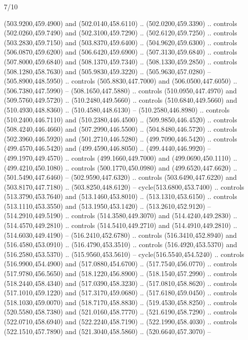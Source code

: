 \begin{flagdescription}{7/10}
\begin{scope}[xshift=0.5\flaglength]
\begin{scope}[scale=0.00185\flagwidth,yshift=245mm,xshift=-43.7mm]
\begin{scope}[y=-0.8pt, x=0.8pt, inner sep=0pt, outer sep=0pt]
\begin{scope}[shift={(-344.0678,183.89831)},fill=brown]
  (503.9200,459.4900) and (502.0140,458.6110) .. (502.0200,459.3390) .. controls
  (502.0260,459.7490) and (502.3100,459.7290) .. (502.6120,459.7250) .. controls
  (503.2830,459.7150) and (503.8370,459.6400) .. (504.9620,459.6300) .. controls
  (506.0870,459.6200) and (506.6420,459.6900) .. (507.3130,459.6840) .. controls
  (507.8000,459.6840) and (508.1370,459.7340) .. (508.1330,459.2850) .. controls
  (508.1280,458.7630) and (505.9830,459.3220) .. (505.9630,457.0280) --
  (505.8900,448.5950) .. controls (505.8830,447.7000) and (506.0500,447.6050) ..
  (506.7380,447.5990) -- (508.1650,447.5880) .. controls (510.0950,447.4970) and
  (509.5760,449.5720) .. (510.2480,449.5660) .. controls (510.6840,449.5660) and
  (510.4930,448.8360) .. (510.4580,448.6130) -- (510.2580,446.8980) .. controls
  (510.2400,446.7110) and (510.2380,446.4500) .. (509.9850,446.4520) .. controls
  (508.4240,446.4660) and (507.2990,446.5500) .. (504.8480,446.5720) .. controls
  (502.3960,446.5920) and (501.2710,446.5280) .. (499.7090,446.5420) .. controls
  (499.4570,446.5420) and (499.4590,446.8050) .. (499.4440,446.9920) --
  (499.1970,449.4570) .. controls (499.1660,449.7000) and (499.0690,450.1110) ..
  (499.4210,450.1080) .. controls (500.1770,450.0980) and (499.6520,447.6620) ..
  (501.5490,447.6460) -- (502.9590,447.6320) .. controls (503.6490,447.6220) and
  (503.8170,447.7180) .. (503.8250,448.6120) -- cycle(513.6800,453.7400) ..
  controls (513.3790,453.7640) and (513.1460,453.8010) .. (513.1310,453.6150) ..
  controls (513.1110,453.3550) and (513.1950,453.1420) .. (513.2610,452.9120) --
  (514.2910,449.5190) .. controls (514.3580,449.3070) and (514.4240,449.2830) ..
  (514.4570,449.2810) .. controls (514.5410,449.2710) and (514.4910,449.2810) ..
  (514.6030,449.4190) -- (516.2410,452.6780) .. controls (516.3410,452.8940) and
  (516.4580,453.0910) .. (516.4790,453.3510) .. controls (516.4920,453.5370) and
  (516.2580,453.5370) .. (515.9560,453.5610) -- cycle(516.5540,454.5240) ..
  controls (516.9900,454.4900) and (517.0880,454.6700) .. (517.7540,456.0770) ..
  controls (517.9780,456.5650) and (518.1220,456.8900) .. (518.1540,457.2990) ..
  controls (518.2440,458.4340) and (517.0390,458.3230) .. (517.0810,458.8620) ..
  controls (517.1010,459.1220) and (517.3170,459.0680) .. (517.6180,459.0450) ..
  controls (518.1030,459.0070) and (518.7170,458.8830) .. (519.4530,458.8250) ..
  controls (520.5580,458.7380) and (521.0160,458.7770) .. (521.6190,458.7290) ..
  controls (522.0710,458.6940) and (522.2240,458.7190) .. (522.1990,458.4030) ..
  controls (522.1510,457.7890) and (521.3040,458.5860) .. (520.6640,457.3070) --

\end{scope}
\end{scope}
\end{scope}
\end{scope}
\end{flagdescription}

